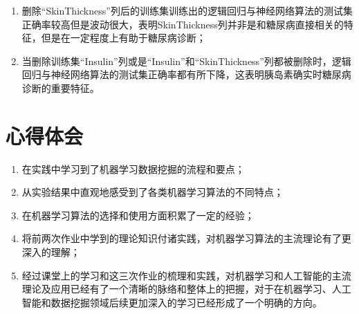 \documentclass[a4paper]{ctexart}
\begin{document}
\begin{enumerate}
\begin{enumerate}[label=\alph*)]
		      \item 删除“SkinThickness”列后的训练集训练出的逻辑回归与神经网络算法的测试集正确率较高但是波动很大，表明SkinThickness列并非是和糖尿病直接相关的特征，但是在一定程度上有助于糖尿病诊断；
		      \item 当删除训练集“Insulin”列或是“Insulin”和“SkinThickness”列都被删除时，逻辑回归与神经网络算法的测试集正确率都有所下降，这表明胰岛素确实时糖尿病诊断的重要特征。
	      \end{enumerate}
\end{enumerate}

\section{心得体会}
\begin{enumerate}
	\item 在实践中学习到了机器学习数据挖掘的流程和要点；
	\item 从实验结果中直观地感受到了各类机器学习算法的不同特点；
	\item 在机器学习算法的选择和使用方面积累了一定的经验；
	\item 将前两次作业中学到的理论知识付诸实践，对机器学习算法的主流理论有了更深入的理解；
	\item 经过课堂上的学习和这三次作业的梳理和实践，对机器学习和人工智能的主流理论及应用已经有了一个清晰的脉络和整体上的把握，对于在机器学习、人工智能和数据挖掘领域后续更加深入的学习已经形成了一个明确的方向。
\end{enumerate}


\end{document}

